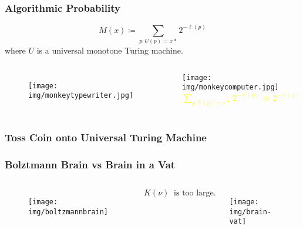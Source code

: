 \documentclass[UTF8,11pt,colorlinks,compress,openany]{beamer}%
\begin{document}
\begin{frame}\frametitle{Algorithmic Probability}
	\begin{definition}
		\[M(x)\coloneqq \sum\limits_{p:U(p)=x*}2^{-\ell(p)}\]
		where $U$ is a universal monotone Turing machine.
	\end{definition}
	\begin{columns}[onlytextwidth]
			\begin{figure}
				\texttt{[image: img/monkeytypewriter.jpg]}
			\end{figure}
			\texttt{[image: img/monkeycomputer.jpg]}\\
			\centering\textcolor{yellow}{\scriptsize{$\sum\limits_{p:U(p)=x*}2^{-\ell(p)}\gg 2^{-\ell(x)}$}}
	\end{columns}
\end{frame}

\begin{frame}\frametitle{Toss Coin onto Universal Turing Machine}
	\begin{figure}[htb]
	\end{figure}
\end{frame}

\begin{frame}\frametitle{Bolztmann Brain vs Brain in a Vat}
	\begin{columns}[onlytextwidth]
			\begin{figure}
				\texttt{[image: img/boltzmannbrain]}
			\end{figure}
			\[K(\nu)\;\;\text{is too large}.\]
			\begin{figure}
				\texttt{[image: img/brain-vat]}
			\end{figure}
	\end{columns}
\end{frame}
\end{document}
